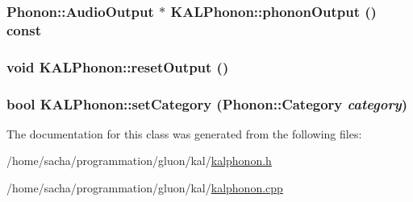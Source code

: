 \hypertarget{class_k_a_l_phonon_4124b8a002123f93d81a52e10f1e32e5}{
\subsubsection[{phononOutput}]{\setlength{\rightskip}{0pt plus 5cm}Phonon::AudioOutput $\ast$ KALPhonon::phononOutput () const}}
\label{class_k_a_l_phonon_4124b8a002123f93d81a52e10f1e32e5}


\hypertarget{class_k_a_l_phonon_30b35bbed8cd7fd3d06d4741a1a2ce11}{
\subsubsection[{resetOutput}]{\setlength{\rightskip}{0pt plus 5cm}void KALPhonon::resetOutput ()}}
\label{class_k_a_l_phonon_30b35bbed8cd7fd3d06d4741a1a2ce11}


\hypertarget{class_k_a_l_phonon_782de15cc855babdf4c83fc7b3f8a413}{
\subsubsection[{setCategory}]{\setlength{\rightskip}{0pt plus 5cm}bool KALPhonon::setCategory (Phonon::Category {\em category})}}
\label{class_k_a_l_phonon_782de15cc855babdf4c83fc7b3f8a413}




The documentation for this class was generated from the following files:\begin{CompactItemize}
\item 
/home/sacha/programmation/gluon/kal/\hyperlink{kalphonon_8h}{kalphonon.h}\item 
/home/sacha/programmation/gluon/kal/\hyperlink{kalphonon_8cpp}{kalphonon.cpp}\end{CompactItemize}
